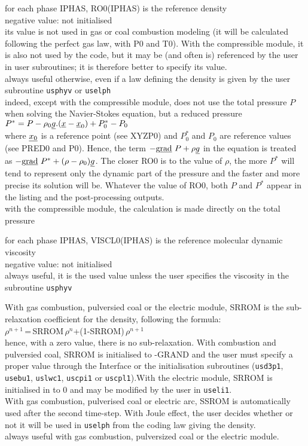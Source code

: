 {for each phase IPHAS, RO0(IPHAS) is the reference density\\
negative value: not initialised\\
its value is not used in gas or coal combustion modeling (it
will be calculated following the perfect gas law, with P0 and T0). With the
compressible module, it is also not used by the code, but it may be (and often
is) referenced by the user in user subroutines; it is therefore better to
specify its value.\\
always useful otherwise, even if a law defining the density is given by
the user subroutine \texttt{usphyv} or \texttt{uselph}\\
indeed, except with the
compressible module, \CS does not
use the total pressure $P$ when solving the Navier-Stokes equation, but a
reduced pressure \\
$P^*=P-\rho_0\underline{g}.(\underline{x}-\underline{x}_0)+P^*_0-P_0$\\
where
$\underline{x_0}$ is a reference point (see XYZP0) and $P^*_0$ and $P_0$ are
reference values (see PRED0 and P0). Hence, the term
$-\text{g}\underline{\text{rad}}\ {P}+\rho\underline{g}$ in the equation is treated as
$-\text{g}\underline{\text{rad}}\ {P^*}+(\rho-\rho_0)\underline{g}$. The closer RO0 is to the value of $\rho$,
the more $P^*$ will tend to represent only the dynamic part of the pressure and
the faster and more precise its solution will be. Whatever the value of RO0,
both $P$ and $P^*$ appear in the listing and the post-processing outputs.\\
with the compressible module, the calculation is made directly on the total
pressure}

{for each phase IPHAS,  VISCL0(IPHAS) is the reference molecular dynamic
viscosity\\
negative value: not initialised\\
always useful, it is the used value unless the user specifies the
viscosity in the subroutine \texttt{usphyv}}

{With gas combustion, pulversied coal or the electric module, SRROM
 is the sub-relaxation coefficient for the density, following the formula:\\
$\rho^{n+1}$\,=\,SRROM\,$\rho^n$+(1-SRROM)\,$\rho^{n+1}$\\
hence, with a zero value, there is no sub-relaxation.
With combustion and pulversied coal, SRROM is initialised to -GRAND
and the user must specify a proper value through the Interface or the
initialisation subroutines (\texttt{usd3p1},
 \texttt{usebu1}, \texttt{uslwc1}, \texttt{uscpi1} or
\texttt{uscpl1}).With the electric module, SRROM is initialised in to 0
and may be modified by the user in \texttt{useli1}.\\
With gas combustion, pulverised coal or electric arc, SSROM is
automatically used after the second time-step. With Joule effect,
the user decides whether or not it will be used in \texttt{uselph}
from the coding law giving the density.}\\
always useful with gas combustion, pulversized coal or the electric module.

